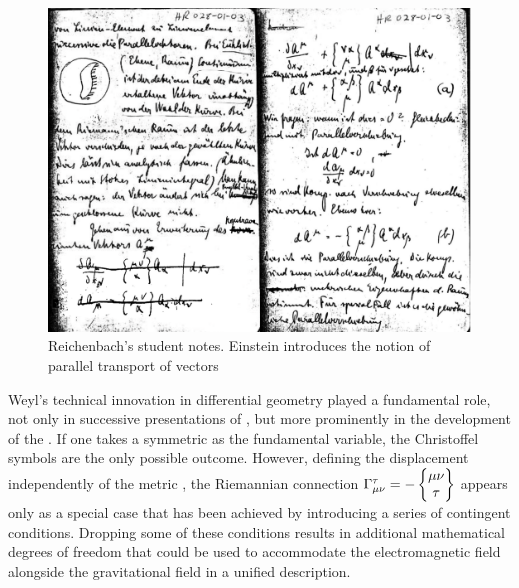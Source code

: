 \documentclass[final]{article}
\renewcommand{\rzlap}[2]{(\cite[#1]{Reichenbach1928}; tr.\ [#2])\xspace}
\begin{document}
\begin{figure}
\begin{center}
 \includegraphics[scale=0.16, trim = 0mm 0mm 0mm 0mm, clip]{parallelverschiebungDOUB.png}
\caption{Reichenbach's student notes. Einstein introduces the notion of parallel transport of vectors}
\label{fig:parallel}
\end{center}
\end{figure}



Weyl's technical innovation in differential geometry played a fundamental role, not only in successive presentations of \gr \citep[see][45ff.]{Einstein1922}, but more prominently in the development of the \uftp. If one takes a symmetric \gmn as the fundamental variable, the Christoffel symbols are the only possible outcome. However, defining the displacement \Gtmn independently of the metric \gmn, the Riemannian connection $\Gamma^\tau_{\mu\nu} = - \begin{Bmatrix} \mu \nu \\ \tau \end{Bmatrix}$ appears only as a special case that has been achieved by introducing a series of contingent conditions. Dropping some of these conditions results in additional mathematical degrees of freedom that could be used to accommodate the electromagnetic field alongside the gravitational field in a unified  description.
\end{document}
